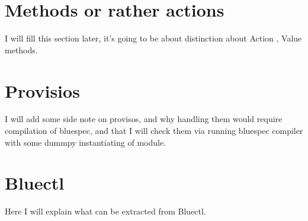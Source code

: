 \documentclass{article}
\begin{document}
\section{Methods or rather actions}
    I will fill this section later, it's going to be about distinction about Action , Value methods.
\section{Provisios}
    I will add some side note on provisos, and why handling them would require compilation of bluespec, and that I will check them via running bluespec compiler with some dummpy instantiating of module.
    
\section{Bluectl}
    Here I will explain what can be extracted from Bluectl.
\end{document}
